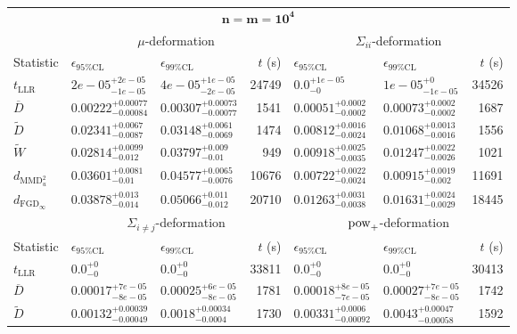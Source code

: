 \begin{tabular}{l|llr|llr}
	\toprule
	\multicolumn{7}{c}{$\mathbf{n=m=10^{4}}$} \\
	\multicolumn{1}{c}{} & \multicolumn{3}{c}{$\mu$-deformation} & \multicolumn{3}{c}{$\Sigma_{ii}$-deformation} \\
	Statistic & $\epsilon_{95\%\mathrm{CL}}$ & $\epsilon_{99\%\mathrm{CL}}$ & $t$ (s) & $\epsilon_{95\%\mathrm{CL}}$ & $\epsilon_{99\%\mathrm{CL}}$ & $t$ (s) \\
	\midrule
	$t_{\mathrm{LLR}}$ & $2e-05_{-1e-05}^{+2e-05}$ & $4e-05_{-2e-05}^{+1e-05}$ & 24749 & $0.0_{-0}^{+1e-05}$ & $1e-05_{-1e-05}^{+0}$ & 34526 \\
	$\overline{D}$ & $0.00222_{-0.00084}^{+0.00077}$ & $0.00307_{-0.00077}^{+0.00073}$ & 1541 & $0.00051_{-0.0002}^{+0.0002}$ & $0.00073_{-0.0002}^{+0.0002}$ & 1687 \\
	$\widetilde{D}$ & $0.02341_{-0.0087}^{+0.0067}$ & $0.03148_{-0.0069}^{+0.0061}$ & 1474 & $0.00812_{-0.0024}^{+0.0016}$ & $0.01068_{-0.0016}^{+0.0013}$ & 1556 \\
	$\widetilde{W}$ & $0.02814_{-0.012}^{+0.0099}$ & $0.03797_{-0.01}^{+0.009}$ & 949 & $0.00918_{-0.0035}^{+0.0025}$ & $0.01247_{-0.0026}^{+0.0022}$ & 1021 \\
	$d_{\mathrm{MMD}^{2}_{u}}$ & $0.03601_{-0.01}^{+0.0081}$ & $0.04577_{-0.0076}^{+0.0065}$ & 10676 & $0.00722_{-0.0024}^{+0.0022}$ & $0.00915_{-0.002}^{+0.0019}$ & 11691 \\
	$d_{\mathrm{FGD}_{\infty}}$ & $0.03878_{-0.014}^{+0.013}$ & $0.05066_{-0.012}^{+0.011}$ & 20710 & $0.01263_{-0.0038}^{+0.0031}$ & $0.01631_{-0.0029}^{+0.0024}$ & 18445 \\
	\toprule
	\multicolumn{1}{c}{} & \multicolumn{3}{c}{$\Sigma_{i\neq j}$-deformation} & \multicolumn{3}{c}{$\rm{pow}_{+}$-deformation} \\
	Statistic & $\epsilon_{95\%\mathrm{CL}}$ & $\epsilon_{99\%\mathrm{CL}}$ & $t$ (s) & $\epsilon_{95\%\mathrm{CL}}$ & $\epsilon_{99\%\mathrm{CL}}$ & $t$ (s) \\
	\midrule
	$t_{\mathrm{LLR}}$ & $0.0_{-0}^{+0}$ & $0.0_{-0}^{+0}$ & 33811 & $0.0_{-0}^{+0}$ & $0.0_{-0}^{+0}$ & 30413 \\
	$\overline{D}$ & $0.00017_{-8e-05}^{+7e-05}$ & $0.00025_{-8e-05}^{+6e-05}$ & 1781 & $0.00018_{-7e-05}^{+8e-05}$ & $0.00027_{-8e-05}^{+7e-05}$ & 1742 \\
	$\widetilde{D}$ & $0.00132_{-0.00049}^{+0.00039}$ & $0.0018_{-0.0004}^{+0.00034}$ & 1730 & $0.00331_{-0.00092}^{+0.0006}$ & $0.0043_{-0.00058}^{+0.00047}$ & 1592 \\

\end{tabular}

